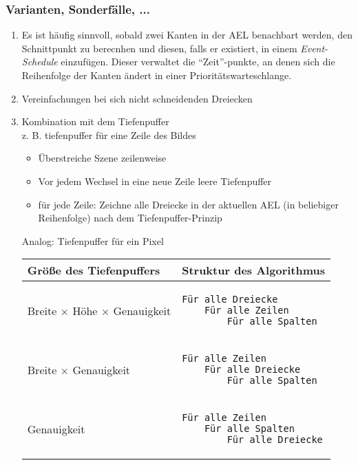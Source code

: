 \subsubsection{Varianten, Sonderfälle, ...}
\begin{enumerate}
 \item Es ist häufig sinnvoll, sobald zwei Kanten in der AEL benachbart werden, den Schnittpunkt zu berecnhen und
	diesen, falls er existiert, in einem \emph{Event-Schedule} einzufügen. Dieser verwaltet die "`Zeit"'-punkte,
	an denen sich die Reihenfolge der Kanten ändert in einer Prioritätswarteschlange.
 \item Vereinfachungen bei sich nicht schneidenden Dreiecken
 \item Kombination mit dem Tiefenpuffer\\
	z. B. tiefenpuffer für eine Zeile des Bildes
	\begin{itemize}
	 \item Überstreiche Szene zeilenweise
	 \item Vor jedem Wechsel in eine neue Zeile leere Tiefenpuffer
	 \item für jede Zeile: Zeichne alle Dreiecke in der aktuellen AEL (in beliebiger Reihenfolge) nach dem
		Tiefenpuffer-Prinzip
	\end{itemize}
	Analog: Tiefenpuffer für ein Pixel
	\begin{center}
	 \begin{tabular}{p{.45\linewidth}|p{.45\linewidth}}
	  Größe des Tiefenpuffers & Struktur des Algorithmus\\
	  \hline\hline
		Breite $\times$ Höhe $\times$ Genauigkeit &
		\begin{minipage}{\linewidth}
		 \vspace{1em}
		 \begin{verbatim}
Für alle Dreiecke
    Für alle Zeilen
        Für alle Spalten
		 \end{verbatim}
		\end{minipage}\\
		\hline
		Breite $\times$ Genauigkeit &
		\begin{minipage}{\linewidth}
		 \vspace{1em}
		 \begin{verbatim}
Für alle Zeilen
    Für alle Dreiecke
        Für alle Spalten
		 \end{verbatim}
		\end{minipage}\\
		\hline
		Genauigkeit &
		\begin{minipage}{\linewidth}
		 \vspace{1em}
		 \begin{verbatim}
Für alle Zeilen
    Für alle Spalten
        Für alle Dreiecke
		 \end{verbatim}
		\end{minipage}\\
	 \end{tabular}
	\end{center}
\end{enumerate}




